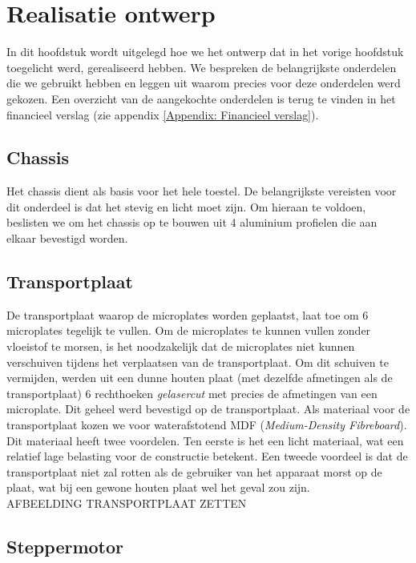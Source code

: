 \documentclass[a4paper,twoside,kulak]{kulakreport} %
\begin{document}
\chapter{Realisatie ontwerp}

In dit hoofdstuk wordt uitgelegd hoe we het ontwerp dat in het vorige hoofdstuk toegelicht werd, gerealiseerd hebben. We bespreken de belangrijkste onderdelen die we gebruikt hebben en leggen uit waarom precies voor deze onderdelen werd gekozen. Een overzicht van de aangekochte onderdelen is terug te vinden in het financieel verslag (zie appendix \ref{Appendix: Financieel verslag}).

\section{Chassis}

Het chassis dient als basis voor het hele toestel. De belangrijkste vereisten voor dit onderdeel is dat het stevig en licht moet zijn. Om hieraan te voldoen, beslisten we om het chassis op te bouwen uit 4 aluminium profielen die aan elkaar bevestigd worden. 

\section{Transportplaat}

De transportplaat waarop de microplates worden geplaatst, laat toe om 6 microplates tegelijk te vullen. Om de microplates te kunnen vullen zonder vloeistof te morsen, is het noodzakelijk dat de microplates niet kunnen verschuiven tijdens het verplaatsen van de transportplaat. Om dit schuiven te vermijden, werden uit een dunne houten plaat (met dezelfde afmetingen als de transportplaat) 6 rechthoeken \textit{gelasercut} met precies de afmetingen van een microplate. Dit geheel werd bevestigd op de transportplaat. Als materiaal voor de transportplaat kozen we voor waterafstotend MDF (\textit{Medium-Density Fibreboard}). Dit materiaal heeft twee voordelen. Ten eerste is het een licht materiaal, wat een relatief lage belasting voor de constructie betekent. Een tweede voordeel is dat de transportplaat niet zal rotten als de gebruiker van het apparaat morst op de plaat, wat bij een gewone houten plaat wel het geval zou zijn.  \\


AFBEELDING TRANSPORTPLAAT ZETTEN



\section{Steppermotor}
\end{document}

